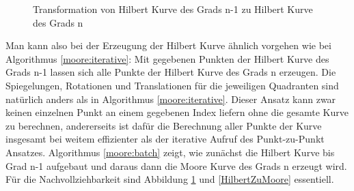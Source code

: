 \documentclass[course=erap]{aspdoc}
\begin{document}
\begin{figure}[h]
\centering
\def\svgwidth{240pt}

\caption{Transformation von Hilbert Kurve des Grads n-1 zu Hilbert Kurve des Grads n}
\label{HilbertZuHilbert}
\end{figure}

Man kann also bei der Erzeugung der Hilbert Kurve ähnlich vorgehen wie bei Algorithmus \ref{moore:iterative}: Mit gegebenen Punkten der Hilbert Kurve des Grads n-1 lassen sich alle Punkte der Hilbert Kurve des Grads n erzeugen.
Die Spiegelungen, Rotationen und Translationen für die jeweiligen Quadranten sind natürlich anders als in Algorithmus \ref{moore:iterative}.
Dieser Ansatz kann zwar keinen einzelnen Punkt an einem gegebenen Index liefern ohne die gesamte Kurve zu berechnen, andererseits ist dafür die Berechnung aller Punkte der Kurve insgesamt bei weitem effizienter als der iterative Aufruf des Punkt-zu-Punkt Ansatzes. Algorithmus \ref{moore:batch} zeigt, wie zunächst die Hilbert Kurve bis Grad n-1 aufgebaut und daraus dann die Moore Kurve des Grads n erzeugt wird. Für die Nachvollziehbarkeit sind Abbildung \ref{HilbertZuHilbert} und \ref{HilbertZuMoore} essentiell.
\end{document}
